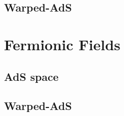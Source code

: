 \documentclass[12pt,a4paper]{article}
\begin{document}
\subsection{Warped-AdS}

\section{Fermionic Fields}

\subsection{AdS space}

\subsection{Warped-AdS}
\end{document}
